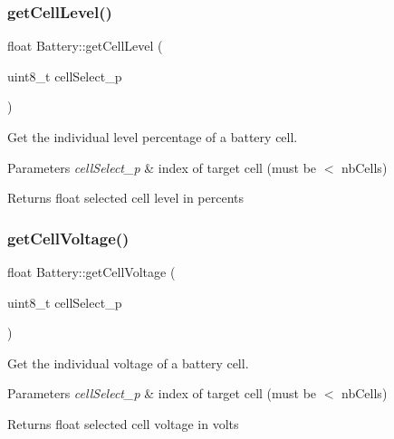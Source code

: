 \subsubsection{\texorpdfstring{get\+Cell\+Level()}{getCellLevel()}}
{\footnotesize\ttfamily float Battery\+::get\+Cell\+Level (\begin{DoxyParamCaption}\item[{uint8\+\_\+t}]{cell\+Select\+\_\+p }\end{DoxyParamCaption})}



Get the individual level percentage of a battery cell. 


\begin{DoxyParams}{Parameters}
{\em cell\+Select\+\_\+p} & index of target cell (must be $<$ nb\+Cells) \\
\hline
\end{DoxyParams}
\begin{DoxyReturn}{Returns}
float selected cell level in percents 
\end{DoxyReturn}
\mbox{\label{class_battery_ae449209593f825ca7cefc958d51ba232}} 
\subsubsection{\texorpdfstring{get\+Cell\+Voltage()}{getCellVoltage()}}
{\footnotesize\ttfamily float Battery\+::get\+Cell\+Voltage (\begin{DoxyParamCaption}\item[{uint8\+\_\+t}]{cell\+Select\+\_\+p }\end{DoxyParamCaption})}



Get the individual voltage of a battery cell. 


\begin{DoxyParams}{Parameters}
{\em cell\+Select\+\_\+p} & index of target cell (must be $<$ nb\+Cells) \\
\hline
\end{DoxyParams}
\begin{DoxyReturn}{Returns}
float selected cell voltage in volts 
\end{DoxyReturn}
\mbox{\label{class_battery_a16e5bfb8a07ce93c08382fbcfb0b19be}} 
